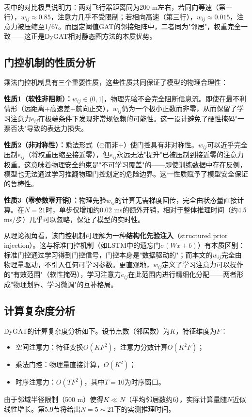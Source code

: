 \documentclass[12pt,a4paper,UTF8]{ctexbook}
\begin{document}
表中的对比极具说明力：两对飞行器距离同为200 m左右，若同向等速（第一行），$w_{ij}\approx0.85$，注意力几乎不受限制；若相向高速（第三行），$w_{ij}\approx0.015$，注意力被压缩至1/67。而固定阈值GAT的邻接矩阵中，二者同为"邻居"，权重完全一致——这正是DyGAT相对静态图方法的本质优势。

\subsection{门控机制的性质分析}

乘法门控机制具有三个重要性质，这些性质共同保证了模型的物理合理性：

\textbf{性质1（软性非阻断）：}$w_{ij}\in(0,1]$，物理先验不会完全阻断信息流。即使在最不利情形（远距离+高速差+航向正交），$w_{ij}$仍为一个极小正数而非零，从而保留了学习注意力$e_{ij}$在极端条件下发现非常规依赖的可能性。这一设计避免了硬性掩码"一票否决"导致的表达力损失。

\textbf{性质2（非对称性）：}乘法形式（$\odot$而非$+$）使门控具有非对称性。$w_{ij}$可以近乎完全压制$e_{ij}$（将权重压缩至接近零），但$e_{ij}$永远无法"提升"已被压制到接近零的注意力权重。这意味着物理安全约束是"不可学习覆盖"的——即使训练数据中存在反例，模型也无法通过学习推翻物理门控划定的危险边界。这一性质赋予了模型安全保证的鲁棒性。

\textbf{性质3（零参数零开销）：}物理先验$w_{ij}$的计算无需梯度回传，完全由状态量直接计算。在$N=21$时，单步仅增加约0.02 ms的额外开销，相对于整体推理时间（约4.5 ms/步）几乎可以忽略，保证了模型的实时性。

从理论视角看，该门控机制可理解为一种\textbf{结构化先验注入}（structured prior injection）。这与标准门控机制（如LSTM中的遗忘门$\sigma(Wx+b)$）有本质区别：标准门控通过学习得到门控信号，门控本身是"数据驱动的"；而本文的$w_{ij}$完全由物理量驱动，不引入任何可学习参数。更直观地，$w_{ij}$定义了学习注意力可以操作的"有效范围"（软性掩码），学习注意力$e_{ij}$在此范围内进行精细化分配——两者形成"物理划界、学习微调"的互补格局。

\subsection{计算复杂度分析}

DyGAT的计算复杂度分析如下。设节点数（邻居数）为$K$，特征维度为$F$：
\begin{itemize}
    \item 空间注意力：特征变换$O(KF^2)$，注意力分数计算$O(K^2F)$；
    \item 乘法门控：物理量直接计算，$O(K^2)$；
    \item 时序注意力：$O(TF^2)$，其中$T=10$为时序窗口。
\end{itemize}
由于邻域半径限制（500 m）使得$K\ll N$（平均邻居数约6），实际计算量随$N$近似线性增长。第5.9节将给出$N=5\sim21$下的实测推理时间。
\end{document}
